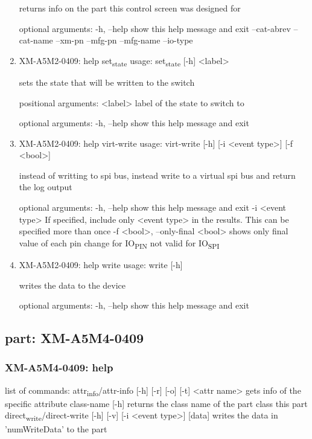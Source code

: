 \documentclass[11pt]{article}
\begin{document}
\begin{enumerate}
returns info on the part this control screen was designed for

optional arguments:
  -h, --help   show this help message and exit
  --cat-abrev
  --cat-name
  --xm-pn
  --mfg-pn
  --mfg-name
  --io-type

\item XM-A5M2-0409: help set\textsubscript{state}
\label{sec:org810d55c}
usage: set\textsubscript{state} [-h] <label>

sets the state that will be written to the switch

positional arguments:
  <label>     label of the state to switch to

optional arguments:
  -h, --help  show this help message and exit

\item XM-A5M2-0409: help virt-write
\label{sec:org3d8da87}
usage: virt-write [-h] [-i <event type>] [-f <bool>]

instead of writting to spi bus, instead write to a virtual spi bus and return
the log output

optional arguments:
  -h, --help            show this help message and exit
  -i <event type>       If specified, include only <event type> in the
                        results. This can be specified more than once
  -f <bool>, --only-final <bool>
                        shows only final value of each pin change for IO\textsubscript{PIN}
                        not valid for IO\textsubscript{SPI}

\item XM-A5M2-0409: help write
\label{sec:orgccf8d59}
usage: write [-h]

writes the data to the device

optional arguments:
  -h, --help  show this help message and exit
\end{enumerate}

\subsection{part: XM-A5M4-0409}
\label{sec:orgca2c0f7}
\subsubsection{XM-A5M4-0409: help}
\label{sec:org3ac2dfe}
list of commands:
  attr\textsubscript{info}/attr-info [-h] [-r] [-o] [-t] <attr name>
    gets info of the specific attribute
  class-name [-h]
    returns the class name of the part class this part
  direct\textsubscript{write}/direct-write [-h] [-v] [-i <event type>] [data]
    writes the data in 'numWriteData' to the part
\end{document}
